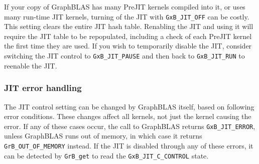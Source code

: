 If your copy of GraphBLAS has many PreJIT kernels compiled into it, or uses
many run-time JIT kernels, turning of the JIT with \verb'GxB_JIT_OFF' can be
costly.  This setting clears the entire JIT hash table.  Renabling the JIT and
using it will require the JIT table to be repopulated, including a check of
each PreJIT kernel the first time they are used.  If you wish to temporarily
disable the JIT, consider switching the JIT control to \verb'GxB_JIT_PAUSE' and
then back to \verb'GxB_JIT_RUN' to reenable the JIT.

\subsubsection{JIT error handling}

The JIT control setting can be changed by GraphBLAS itself, based on
following error conditions.  These changes affect all kernels, not just the
kernel causing the error.  If any of these cases occur, the call to GraphBLAS
returns \verb'GxB_JIT_ERROR', unless GraphBLAS runs out of memory, in which
case it returns \verb'GrB_OUT_OF_MEMORY' instead.  If the JIT is disabled
through any of these errors, it can be detected by \verb'GrB_get' to read the
\verb'GxB_JIT_C_CONTROL' state.

